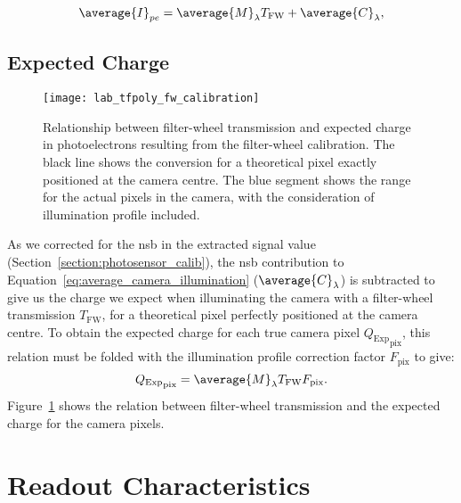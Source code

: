 \begin{equation} \label{eq:average_camera_illumination}
\average{I}_{pe} = \average{M}_\lambda T_\text{FW} + \average{C}_\lambda,
\end{equation}

\subsection{Expected Charge}

\begin{figure}
	\centering
    \texttt{[image: lab\_tfpoly\_fw\_calibration]} 
	\caption[Calibration from Filter-Wheel Transmission to Expected ]{Relationship between filter-wheel transmission and expected charge in photoelectrons resulting from the filter-wheel calibration. The black line shows the conversion for a theoretical pixel exactly positioned at the camera centre. The blue segment shows the range for the actual pixels in the camera, with the consideration of illumination profile included.}
	\label{fig:fw_calibration}
\end{figure}

As we corrected for the \gls{nsb} in the extracted signal value (Section~\ref{section:photosensor_calib}), the \gls{nsb} contribution to Equation~\ref{eq:average_camera_illumination} ($\average{C}_\lambda$) is subtracted to give us the charge we expect when illuminating the camera with a filter-wheel transmission $T_\text{FW}$, for a theoretical pixel perfectly positioned at the camera centre. To obtain the expected charge for each true camera pixel ${Q_\text{Exp}}_\text{pix}$, this relation must be folded with the illumination profile correction factor $F_\text{pix}$ to give:
\begin{equation} \label{eq:average_camera_illumination}
{Q_\text{Exp}}_\text{pix} = \average{M}_\lambda T_\text{FW}F_\text{pix}.
\end{equation}
Figure~\ref{fig:fw_calibration} shows the relation between filter-wheel transmission and the expected charge for the camera pixels.

\section{Readout Characteristics}


